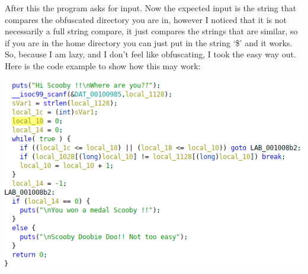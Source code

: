 \documentclass[12pt]{article}
\begin{document}
After this the program asks for input. Now the expected input is the string that compares the obfuscated directory you are in, however I 
noticed that it is not necessarily a full string compare, it just compares the strings that are similar, so if you are in the home directory
you can just put in the string `\$' and it works. So, because I am lazy, and I don't feel like obfuscating, I took the easy way out. Here is
the code example to show how this may work:

\begin{center}
	\includegraphics[scale=.96]{problem6.png}
\end{center}
\end{document}
